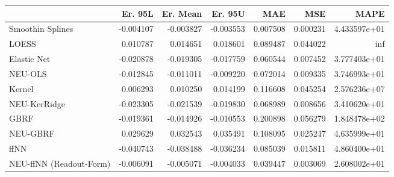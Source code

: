 \begin{tabular}{lrrrrrr}
\toprule
{} &   Er. 95L &  Er. Mean &   Er. 95U &       MAE &       MSE &          MAPE \\
\midrule
Smoothin Splines        & -0.004107 & -0.003827 & -0.003553 &  0.007508 &  0.000231 &  4.433597e+01 \\
LOESS                   &  0.010787 &  0.014651 &  0.018601 &  0.089487 &  0.044022 &           inf \\
Elastic Net             & -0.020878 & -0.019305 & -0.017759 &  0.060544 &  0.007452 &  3.777403e+01 \\
NEU-OLS                 & -0.012845 & -0.011011 & -0.009220 &  0.072014 &  0.009335 &  3.746993e+01 \\
Kernel                  &  0.006293 &  0.010250 &  0.014199 &  0.116608 &  0.045254 &  2.576236e+07 \\
NEU-KerRidge            & -0.023305 & -0.021539 & -0.019830 &  0.068989 &  0.008656 &  3.410620e+01 \\
GBRF                    & -0.019361 & -0.014926 & -0.010553 &  0.200898 &  0.056279 &  1.848478e+02 \\
NEU-GBRF                &  0.029629 &  0.032543 &  0.035491 &  0.108095 &  0.025247 &  4.635999e+01 \\
ffNN                    & -0.040743 & -0.038488 & -0.036234 &  0.085039 &  0.015811 &  4.860400e+01 \\
NEU-ffNN (Readout-Form) & -0.006091 & -0.005071 & -0.004033 &  0.039447 &  0.003069 &  2.608002e+01 \\
\bottomrule
\end{tabular}
